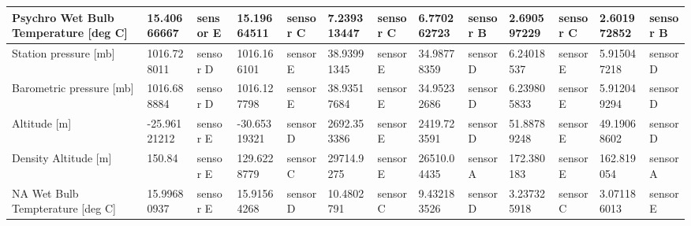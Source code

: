 \documentclass[a4paper,12pt]{article} %
\begin{document}
\begin{enumerate}
\begin{table} [H]
{\begin{tabular}{|l|l|l|l|l|l|l|l|l|l|l|l|l|}
Psychro Wet Bulb Temperature {[}deg C{]}                 & 15.40666667              & sensor E                    & 15.19664511              & sensor C                    & 7.239313447              & sensor C                    & 6.770262723              & sensor B                    & 2.690597229              & sensor C                    & 2.601972852              & sensor B                    \\ \hline
Station pressure {[}mb{]}                                & 1016.728011              & sensor D                    & 1016.166101              & sensor E                    & 38.93991345              & sensor E                    & 34.98778359              & sensor D                    & 6.24018537               & sensor E                    & 5.915047218              & sensor D                    \\ \hline
Barometric pressure {[}mb{]}                             & 1016.688884              & sensor D                    & 1016.127798              & sensor E                    & 38.93517684              & sensor E                    & 34.95232686              & sensor D                    & 6.239805833              & sensor E                    & 5.912049294              & sensor D                    \\ \hline
Altitude {[}m{]}                                         & -25.96121212             & sensor E                    & -30.65319321             & sensor D                    & 2692.353386              & sensor E                    & 2419.723591              & sensor D                    & 51.88789248              & sensor E                    & 49.19068602              & sensor D                    \\ \hline
Density Altitude {[}m{]}                                 & 150.84                   & sensor E                    & 129.6228779              & sensor C                    & 29714.9275               & sensor E                    & 26510.04435              & sensor A                    & 172.380183               & sensor E                    & 162.819054               & sensor A                    \\ \hline
NA Wet Bulb Tempterature {[}deg C{]}                     & 15.99680937              & sensor E                    & 15.91564268              & sensor D                    & 10.4802791               & sensor C                    & 9.432183526              & sensor D                    & 3.237325918              & sensor C                    & 3.071186013              & sensor E                    \\ \hline

\end{tabular}}
\end{table}
\end{enumerate}
\end{document}
